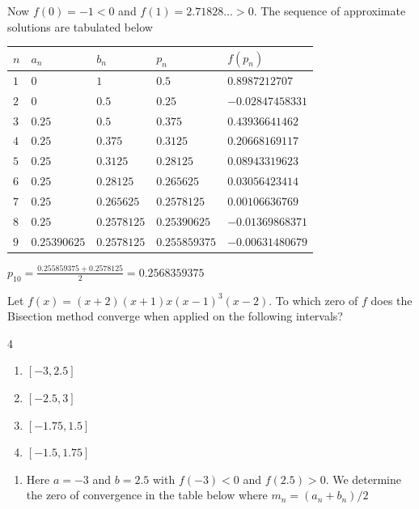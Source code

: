 \begin{posttest}
\begin{mysolution}
\begin{enumerate}[label=(\alph*)]
Now $f(0)=-1<0$ and $f(1)=2.71828\ldots>0$. The sequence of approximate solutions are tabulated below
\begin{center}
\begin{tabular}{lllll}\hline
$n$&$a_n$&$b_n$&$p_n$&$f(p_n)$\\\hline
$1$&$0$&$1$&$0.5$&$0.8987212707$\\
$2$&$0$&$0.5$&$0.25$&$-0.02847458331$\\
$3$&$0.25$&$0.5$&$0.375$&$0.43936641462$\\
$4$&$0.25$&$0.375$&$0.3125$&$0.20668169117$\\
$5$&$0.25$&$0.3125$&$0.28125$&$0.08943319623$\\
$6$&$0.25$&$0.28125$&$0.265625$&$0.03056423414$\\
$7$&$0.25$&$0.265625$&$0.2578125$&$0.00106636769$\\
$8$&$0.25$&$0.2578125$&$0.25390625$&$-0.01369868371$\\
$9$&$0.25390625$&$0.2578125$&$0.255859375$&$-0.00631480679$\\
\hline
\end{tabular}
\end{center}


\vspace{3mm}
$p_{10}=\frac{0.255859375+0.2578125}{2}=0.2568359375$
\end{enumerate}
\end{mysolution}
\item Let $f(x) = (x+2)(x+1)x(x-1)^3(x-2)$. To which zero of $f$ does the Bisection method converge when applied on the following intervals?
\begin{multicols}{4}
 \begin{enumerate}[label=(\alph*)]
\item $[-3,2.5]$
\item $[-2.5,3]$
 \item $[-1.75,1.5]$
\item $[-1.5,1.75]$
\end{enumerate}
\end{multicols}
\begin{mysolution}
 \begin{enumerate}[label=(\alph*)]
\item Here $a=-3$ and $b=2.5$ with $f(-3)<0$ and $f(2.5)>0$. We determine the zero of convergence in the table below where $m_n=(a_n+b_n)/2$


\end{enumerate}
\end{mysolution}
\end{posttest}
